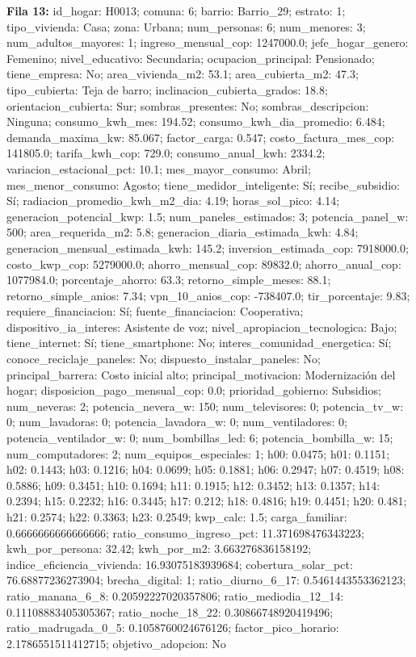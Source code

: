 {\footnotesize\textbf{Fila 13:} id\_hogar: H0013; comuna: 6; barrio: Barrio\_29; estrato: 1; tipo\_vivienda: Casa; zona: Urbana; num\_personas: 6; num\_menores: 3; num\_adultos\_mayores: 1; ingreso\_mensual\_cop: 1247000.0; jefe\_hogar\_genero: Femenino; nivel\_educativo: Secundaria; ocupacion\_principal: Pensionado; tiene\_empresa: No; area\_vivienda\_m2: 53.1; area\_cubierta\_m2: 47.3; tipo\_cubierta: Teja de barro; inclinacion\_cubierta\_grados: 18.8; orientacion\_cubierta: Sur; sombras\_presentes: No; sombras\_descripcion: Ninguna; consumo\_kwh\_mes: 194.52; consumo\_kwh\_dia\_promedio: 6.484; demanda\_maxima\_kw: 85.067; factor\_carga: 0.547; costo\_factura\_mes\_cop: 141805.0; tarifa\_kwh\_cop: 729.0; consumo\_anual\_kwh: 2334.2; variacion\_estacional\_pct: 10.1; mes\_mayor\_consumo: Abril; mes\_menor\_consumo: Agosto; tiene\_medidor\_inteligente: Sí; recibe\_subsidio: Sí; radiacion\_promedio\_kwh\_m2\_dia: 4.19; horas\_sol\_pico: 4.14; generacion\_potencial\_kwp: 1.5; num\_paneles\_estimados: 3; potencia\_panel\_w: 500; area\_requerida\_m2: 5.8; generacion\_diaria\_estimada\_kwh: 4.84; generacion\_mensual\_estimada\_kwh: 145.2; inversion\_estimada\_cop: 7918000.0; costo\_kwp\_cop: 5279000.0; ahorro\_mensual\_cop: 89832.0; ahorro\_anual\_cop: 1077984.0; porcentaje\_ahorro: 63.3; retorno\_simple\_meses: 88.1; retorno\_simple\_anios: 7.34; vpn\_10\_anios\_cop: -738407.0; tir\_porcentaje: 9.83; requiere\_financiacion: Sí; fuente\_financiacion: Cooperativa; dispositivo\_ia\_interes: Asistente de voz; nivel\_apropiacion\_tecnologica: Bajo; tiene\_internet: Sí; tiene\_smartphone: No; interes\_comunidad\_energetica: Sí; conoce\_reciclaje\_paneles: No; dispuesto\_instalar\_paneles: No; principal\_barrera: Costo inicial alto; principal\_motivacion: Modernización del hogar; disposicion\_pago\_mensual\_cop: 0.0; prioridad\_gobierno: Subsidios; num\_neveras: 2; potencia\_nevera\_w: 150; num\_televisores: 0; potencia\_tv\_w: 0; num\_lavadoras: 0; potencia\_lavadora\_w: 0; num\_ventiladores: 0; potencia\_ventilador\_w: 0; num\_bombillas\_led: 6; potencia\_bombilla\_w: 15; num\_computadores: 2; num\_equipos\_especiales: 1; h00: 0.0475; h01: 0.1151; h02: 0.1443; h03: 0.1216; h04: 0.0699; h05: 0.1881; h06: 0.2947; h07: 0.4519; h08: 0.5886; h09: 0.3451; h10: 0.1694; h11: 0.1915; h12: 0.3452; h13: 0.1357; h14: 0.2394; h15: 0.2232; h16: 0.3445; h17: 0.212; h18: 0.4816; h19: 0.4451; h20: 0.481; h21: 0.2574; h22: 0.3363; h23: 0.2549; kwp\_calc: 1.5; carga\_familiar: 0.6666666666666666; ratio\_consumo\_ingreso\_pct: 11.371698476343223; kwh\_por\_persona: 32.42; kwh\_por\_m2: 3.663276836158192; indice\_eficiencia\_vivienda: 16.93075183939684; cobertura\_solar\_pct: 76.68877236273904; brecha\_digital: 1; ratio\_diurno\_6\_17: 0.5461443553362123; ratio\_manana\_6\_8: 0.20592227020357806; ratio\_mediodia\_12\_14: 0.11108883405305367; ratio\_noche\_18\_22: 0.30866748920419496; ratio\_madrugada\_0\_5: 0.1058760024676126; factor\_pico\_horario: 2.1786551511412715; objetivo\_adopcion: No\par}
